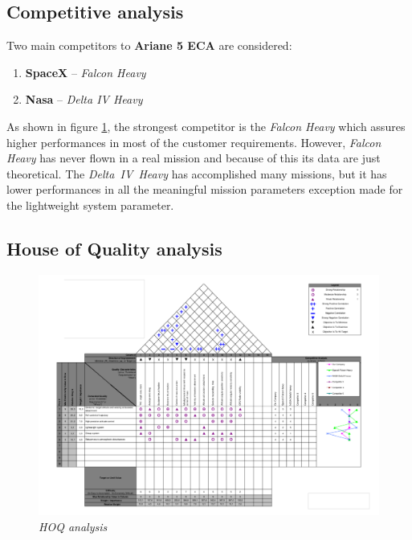 \documentclass[12pt,fleqn,openany]{book} %
\begin{document}
\subsection{Competitive analysis}
Two main competitors to \textbf{Ariane 5 ECA} are considered:
\begin{enumerate}
 \item \textbf{SpaceX} – \textit{Falcon Heavy}
 \item \textbf{Nasa} – \textit{Delta IV Heavy}
\end{enumerate}
As shown in figure \hypertarget{fig:hoq}{\ref{fig:hoq}}, the strongest competitor is the \textit{Falcon Heavy} which assures higher performances in most of the customer requirements. However, \textit{Falcon Heavy} has never flown in a real mission and because of this its data are just theoretical. The \textit{Delta~IV~Heavy} has accomplished many missions, but it has lower performances in all the meaningful mission parameters exception made for the lightweight system parameter.
\newpage
\subsection{House of Quality analysis}
\begin{figure}[h]
 \centering
 \includegraphics[width=1.2\textwidth,angle=270]{hoq}
 \caption{\emph{HOQ analysis}}
 \label{fig:hoq}
\end{figure}
\end{document}
